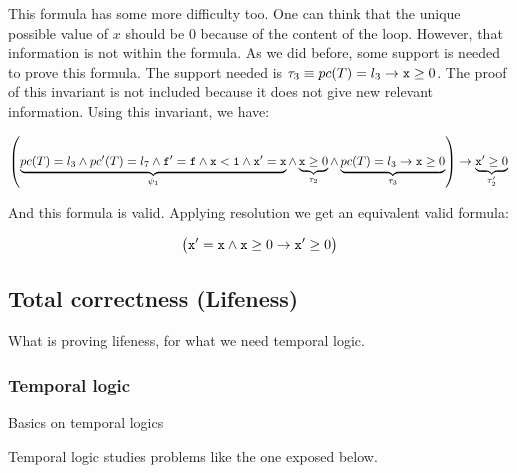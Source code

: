 \begin{example}
	This formula has some more difficulty too.
	One can think that the unique possible value of $x$ should be $0$ because of the content of the loop.
	However, that information is not within the formula.
	As we did before, some support is needed to prove this formula.
	The support needed is $\tau_3 \equiv pc(T) = l_3 \to \mathtt{x} \geq 0$.
	The proof of this invariant is not included because it does not give new relevant information. 
	Using this invariant, we have:

	\[

		\left(
			\underbrace{\pc(T) = l_3 \andcond \pc'(T) = l_7 \andcond \mathtt{f'=f} \andcond \mathtt{x<1} \andcond \mathtt{x'=x}}_{\psi_1} \andcond \underbrace{\mathtt{x} \geq 0}_{\tau_2} \andcond \underbrace{\pc(T) = l_3 \to \mathtt{x}\geq 0 }_{\tau_3}
		\right) 
			\to \underbrace{\mathtt{x}' \geq 0}_{\tau_2'}\\\\
	\]
	
	And this formula is valid. Applying resolution we get an equivalent valid formula:

	\[
		\left(
			\mathtt{x'=x}  \wedge \mathtt{x}\geq 0 \to \mathtt{x'}\geq 0
		\right)
	\]


\end{example}

\begin{example}
\end{example}




\subsection{Total correctness (Lifeness)}

What is proving lifeness, for what we need temporal logic.

\subsubsection{Temporal logic}

Basics on temporal logics

Temporal logic studies problems like the one exposed below.


